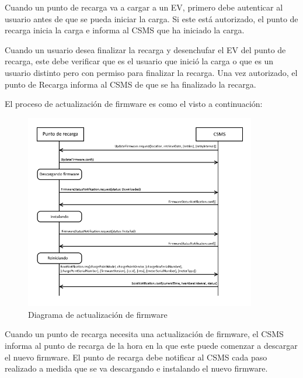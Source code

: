 \documentclass[12pt,a4paper,onecolumn,oneside]{report}
\newcounter{subsubsubsection}[subsubsection]
\begin{document}
Cuando un punto de recarga va a cargar a un EV, primero debe autenticar al usuario antes de que se pueda iniciar la carga. Si este está autorizado, el punto de recarga inicia la carga e informa al CSMS que ha iniciado la carga.

Cuando un usuario desea finalizar la recarga y desenchufar el EV del punto de recarga, este debe verificar que es el usuario que inició la carga o que es un usuario distinto pero con permiso para finalizar la recarga. Una vez autorizado, el punto de Recarga informa al CSMS de que se ha finalizado la recarga.

El proceso de actualización de firmware es como el visto a continuación:

\begin{figure}[H] 
\centering
  \includegraphics[width=0.9\textwidth]{figuras/diagramaactualizacionfirmware.png}
  \caption[Diagrama de actualización de firmware]{Diagrama de actualización de firmware\\
  }
  \label{fig:diagramaactualizacionfirmware}
\end{figure}

Cuando un punto de recarga necesita una actualización de firmware, el CSMS informa al punto de recarga de la hora en la que este puede comenzar a descargar el nuevo firmware. El punto de recarga debe notificar al CSMS cada paso realizado a medida que se va descargando e instalando el nuevo firmware.

\label{Modos de autorización local y funcionamiento sin conexión}
\end{document}
